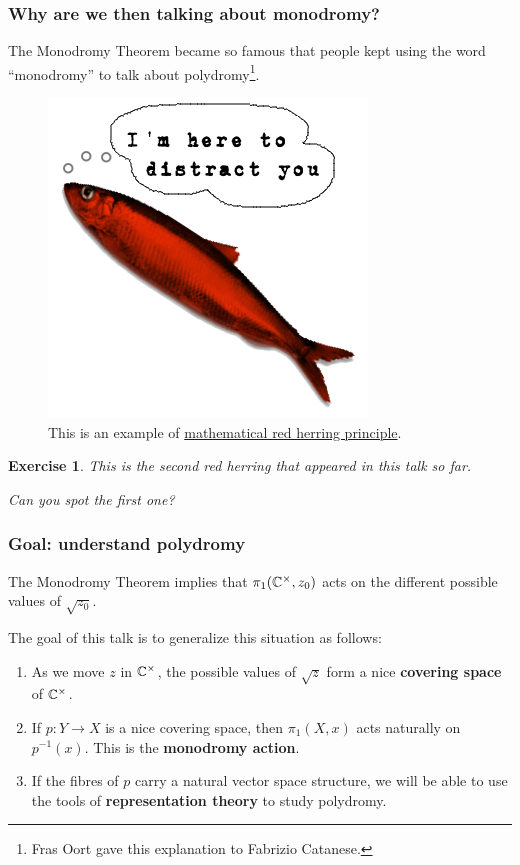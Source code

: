 \documentclass[notheorems, hyperref={backref}]{beamer}
\newtheorem{exe}{Exercise}
\begin{document}
\begin{frame}
    \frametitle{Why are we then talking about monodromy?}
    The Monodromy Theorem became so famous that people kept using the word ``monodromy'' to talk about polydromy\footnote{Fras Oort gave this explanation to Fabrizio Catanese.}.
    \pause
    \begin{figure}[htp]
    
	\centering
	\includegraphics[scale=.3]{pictures/RedHerring.png}
	\caption{This is an example of \href{https://ncatlab.org/nlab/show/red+herring+principle}{mathematical red herring principle}.}
    \end{figure}
    \pause
    \setcounter{exe}{-1}
    \begin{exe}
	This is the second red herring that appeared in this talk so far.

	Can you spot the first one?
    \end{exe}
\end{frame}

\begin{frame}
    \frametitle{Goal: understand polydromy}
    The Monodromy Theorem implies that $\pi_{1}(\mathbb{C}^{\times},z_{0})$ acts on the different possible values of $\sqrt{z_{0}}$.
    \pause

    The goal of this talk is to generalize this situation as follows:
    \pause
    \begin{enumerate}[label=\textbullet]
	\setlength\itemsep{1em}
	\item As we move $z$ in $\mathbb{C}^{\times}$, the possible values of $\sqrt{z}$ form a nice \textbf{covering space} of $\mathbb{C}^{\times}$.
	\pause
	\item If $p\colon Y\to X$ is a nice covering space, then $\pi_{1}(X,x)$ acts naturally on $p^{-1}(x)$.
	    This is the \textbf{monodromy action}.
	\pause
    \item If the fibres of $p$ carry a natural vector space structure, we will be able to use the tools of \textbf{representation theory} to study polydromy.
    \end{enumerate}
\end{frame}
\end{document}

